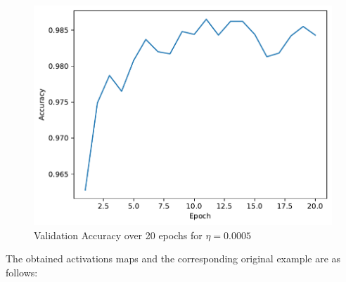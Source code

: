 \begin{questions}
            \begin{figure}[H]
                \centering
                \includegraphics[scale=0.6]{CNN-validation-accuracy-0.0005-0.3-0-adam.pdf}
                \caption{Validation Accuracy over 20 epochs for $\eta = 0.0005$}
                \label{}
            \end{figure}
        \clearpage
        \question
            The obtained activations maps and the corresponding original example are as follows:

                
            

\end{questions}
